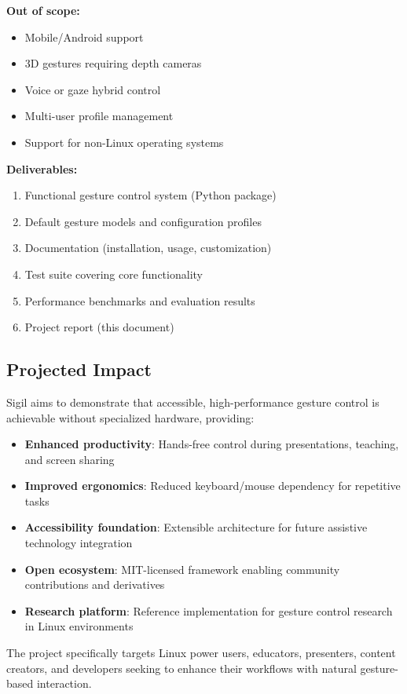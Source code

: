 \documentclass[11pt,a4paper]{article}
\begin{document}
\textbf{Out of scope:}
\begin{itemize}
\item Mobile/Android support
\item 3D gestures requiring depth cameras
\item Voice or gaze hybrid control
\item Multi-user profile management
\item Support for non-Linux operating systems
\end{itemize}

\textbf{Deliverables:}
\begin{enumerate}
\item Functional gesture control system (Python package)
\item Default gesture models and configuration profiles
\item Documentation (installation, usage, customization)
\item Test suite covering core functionality
\item Performance benchmarks and evaluation results
\item Project report (this document)
\end{enumerate}

\subsection{Projected Impact}

Sigil aims to demonstrate that accessible, high-performance gesture control is achievable without specialized hardware, providing:

\begin{itemize}
\item \textbf{Enhanced productivity}: Hands-free control during presentations, teaching, and screen sharing
\item \textbf{Improved ergonomics}: Reduced keyboard/mouse dependency for repetitive tasks
\item \textbf{Accessibility foundation}: Extensible architecture for future assistive technology integration
\item \textbf{Open ecosystem}: MIT-licensed framework enabling community contributions and derivatives
\item \textbf{Research platform}: Reference implementation for gesture control research in Linux environments
\end{itemize}

The project specifically targets Linux power users, educators, presenters, content creators, and developers seeking to enhance their workflows with natural gesture-based interaction.
\end{document}
